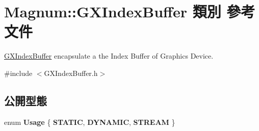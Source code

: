 \hypertarget{class_magnum_1_1_g_x_index_buffer}{}\section{Magnum\+:\+:G\+X\+Index\+Buffer 類別 參考文件}
\label{class_magnum_1_1_g_x_index_buffer}


\hyperlink{class_magnum_1_1_g_x_index_buffer}{G\+X\+Index\+Buffer} encapsulate a the Index Buffer of Graphics Device.  




{\ttfamily \#include $<$G\+X\+Index\+Buffer.\+h$>$}

\subsection*{公開型態}
\begin{DoxyCompactItemize}
\item 
enum {\bfseries Usage} \{ {\bfseries S\+T\+A\+T\+IC}, 
{\bfseries D\+Y\+N\+A\+M\+IC}, 
{\bfseries S\+T\+R\+E\+AM}
 \}\hypertarget{class_magnum_1_1_g_x_index_buffer_a6cf47666f27b76efba818580dcdd9abc}{}\label{class_magnum_1_1_g_x_index_buffer_a6cf47666f27b76efba818580dcdd9abc}

\end{DoxyCompactItemize}
